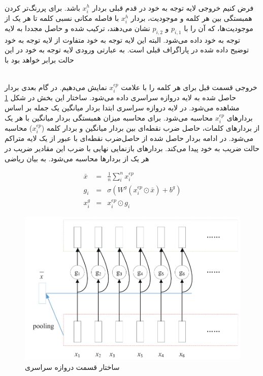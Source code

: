 \begin{eqnarray}
    [x_i, e^{h}, e^{t}]
\end{eqnarray}

فرض کنیم خروجی لایه توجه به خود در قدم قبلی بردار $x^{h}_i$ باشد. برای پررنگ‌‌‌تر کردن همبستگی بین هر کلمه و
موجودیت‌، بردار $x^{h}_i$ با فاصله مکانی نسبی کلمه تا هر یک از موجودیت‌ها، که آن را با $p_{i,1}$ و
$p_{i,2}$ نشان می‌دهند، ترکیب شده و حاصل مجددا به لایه توجه به خود داده می‌شود. البته این لایه توجه به خود
متفاوت از لایه توجه به خود توضیح داده شده در پاراگراف قبلی است. به عبارتی ورودی لایه توجه به
خود در این حالت برابر خواهد بود با

\begin{eqnarray}
    [x^{h}_i, p_{i,1}, p_{i,2}]
\end{eqnarray}

خروجی قسمت قبل برای هر کلمه را با علامت $x^{ep}_i$ نمایش می‌دهیم. در گام بعدی بردار حاصل شده به لایه دروازه سراسری
داده می‌شود. ساختار این بخش در شکل \ref{gate_structure} مشاهده می‌شود. در لایه دروازه سراسری ابتدا بردار میانگین یک جمله بر اساس
بردار‌های $x^{ep}_i$ محاسبه می‌شود. برای محاسبه میزان همبستگی بردار میانگین با هر یک از بردار‌های کلمات، حاصل ضرب نقطه‌ای
بین بردار میانگین و بردار کلمه ($x^{ep}_i$) محاسبه می‌شود. در ادامه بردار حاصل شده از حاصل‌ضرب نقطه‌ای با عبور از یک لایه
متراکم حالت ضریب به خود پیدا می‌کند. بردار‌های بازنمایی نهایی با ضرب این مقادیر ضریب در هر یک از بردار‌ها محاسبه می‌شود.
به بیان ریاضی

\begin{eqnarray}
    \bar{x} & = & \frac{1}{n} \sum_{i}^{n} x^{ep}_i \\
    g_i & = & \sigma(W^g (x^{ep}_i \odot \bar{x}) + b^g) \\
    x^{g}_i & = & x^{ep}_i \odot g_i
\end{eqnarray}

\begin{figure}[h]
    \centering
    \includegraphics[scale=0.2]{images/gated/gate.png}
    \caption{ساختار قسمت دروازه سراسری}
    \label{gate_structure}
\end{figure}

